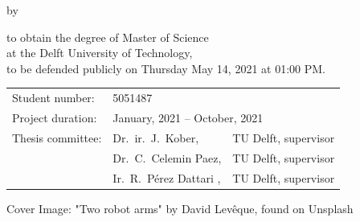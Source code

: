 \begin{titlepage}

\begin{center}

{\makeatletter
\largetitlestyle\fontsize{45}{45}\selectfont\@title
\makeatother}

\bigskip

{\makeatletter
\ifdefvoid{\@subtitle}{}{\subfont\fontsize{20}{20}\selectfont\@subtitle}
\makeatother}

\bigskip
\bigskip

by

\bigskip
\bigskip

{\makeatletter
\largetitlestyle\fontsize{25}{25}\selectfont\@author
\makeatother}

\bigskip
\bigskip

to obtain the degree of Master of Science \\
at the Delft University of Technology, \\
to be defended publicly on Thursday May 14, 2021 at 01:00 PM.

\vfill

\begin{tabular}{lll}
    Student number: & 5051487 \\
        Project duration: & \multicolumn{2}{l}{January, 2021 -- October, 2021} \\
    Thesis committee: & Dr.\ ir.\ J.\ Kober, & TU Delft, supervisor \\
        & Dr.\ C.\ Celemin Paez, & TU Delft, supervisor \\
        & Ir.\ R.\ Pérez Dattari , & TU Delft, supervisor
\end{tabular}

\vspace{1cm}
\small{Cover Image: "Two robot arms" by David Levêque, found on Unsplash}

\end{center}


\end{titlepage}
